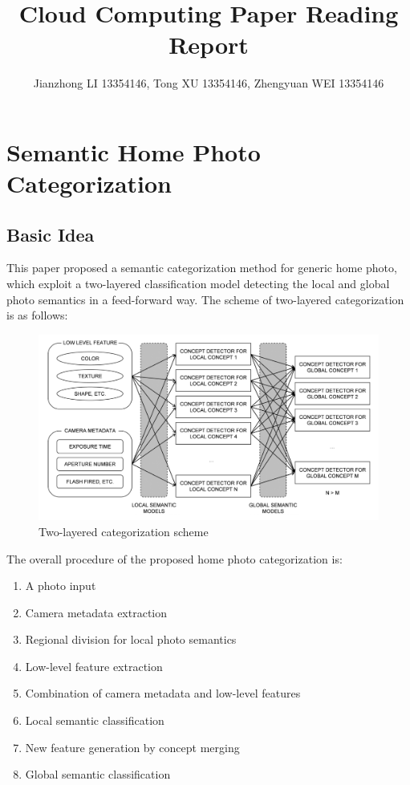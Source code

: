 \documentclass[a4paper]{article}
\title{Cloud Computing Paper Reading Report}
\author{Jianzhong LI 13354146, Tong XU 13354146, Zhengyuan WEI 13354146}
\begin{document}
    \maketitle
    \section{Semantic Home Photo Categorization}
        \subsection{Basic Idea}
        This paper proposed a semantic categorization method for generic home photo, which exploit a two-layered classification model detecting the local and global photo semantics in a feed-forward way. The scheme of two-layered categorization is as follows:

        \begin{figure}[!htb] \begin{center}
             \includegraphics[scale=0.3]{scheme}
             \caption{Two-layered categorization scheme}
        \end{center} \end{figure}

        The overall procedure of the proposed home photo categorization is:
        \begin{enumerate}
            \item A photo input
            \item Camera metadata extraction
            \item Regional division for local photo semantics
            \item Low-level feature extraction
            \item Combination of camera metadata and low-level features
            \item Local semantic classification
            \item New feature generation by concept merging
            \item Global semantic classification
        \end{enumerate}
\end{document}
